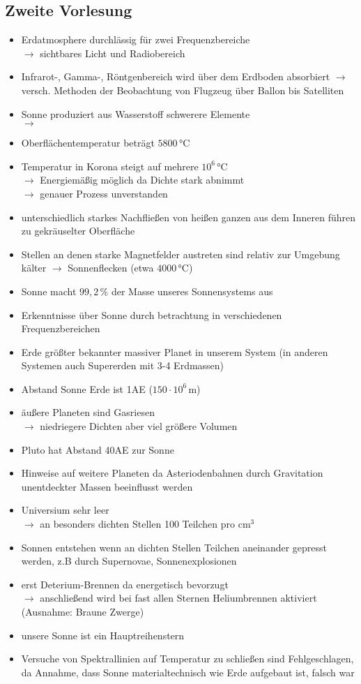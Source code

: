 \subsection{Zweite Vorlesung}
\begin{itemize}
\item Erdatmosphere durchlässig für zwei Frequenzbereiche\\
$\longrightarrow$ sichtbares Licht und Radiobereich
\item Infrarot-, Gamma-, Röntgenbereich wird über dem Erdboden absorbiert
$\longrightarrow$ versch. Methoden der Beobachtung von Flugzeug über Ballon bis Satelliten
\item Sonne produziert aus Wasserstoff schwerere Elemente\\
$\longrightarrow$
\item Oberflächentemperatur beträgt $5800\,\text{°C}$
\item Temperatur in Korona steigt auf mehrere $10^6\,\text{°C}$\\
$\longrightarrow$ Energiemäßig möglich da Dichte stark abnimmt\\
$\longrightarrow$ genauer Prozess unverstanden
\item unterschiedlich starkes Nachfließen von heißen ganzen aus dem Inneren führen zu gekräuselter Oberfläche
\item Stellen an denen starke Magnetfelder austreten sind relativ zur Umgebung kälter
$\longrightarrow$ Sonnenflecken (etwa $4000\,\text{°C}$)
\item Sonne macht $99,2\,\%$ der Masse unseres Sonnensystems aus
\item Erkenntnisse über Sonne durch betrachtung in verschiedenen Frequenzbereichen
\item Erde größter bekannter massiver Planet in unserem System (in anderen Systemen auch Supererden mit 3-4 Erdmassen)
\item Abstand Sonne Erde ist 1AE ($150\cdot 10^6\,\text{m}$)
\item äußere Planeten sind Gasriesen\\
$\longrightarrow$ niedriegere Dichten aber viel größere Volumen
\item Pluto hat Abstand 40AE zur Sonne
\item Hinweise auf weitere Planeten da Asteriodenbahnen durch Gravitation unentdeckter Massen beeinflusst werden
\item Universium sehr leer\\
$\longrightarrow$ an besonders dichten Stellen 100 Teilchen pro $\text{cm}^3$
\item Sonnen entstehen wenn an dichten Stellen Teilchen aneinander gepresst werden, z.B durch Supernovae, Sonnenexplosionen
\item erst Deterium-Brennen da energetisch bevorzugt\\
$\longrightarrow$ anschließend wird bei fast allen Sternen Heliumbrennen aktiviert (Ausnahme: Braune Zwerge)
\item unsere Sonne ist ein Hauptreihenstern
\item Versuche von Spektrallinien auf Temperatur zu schließen sind Fehlgeschlagen, da Annahme, dass Sonne materialtechnisch wie Erde aufgebaut ist, falsch war


\end{itemize}
